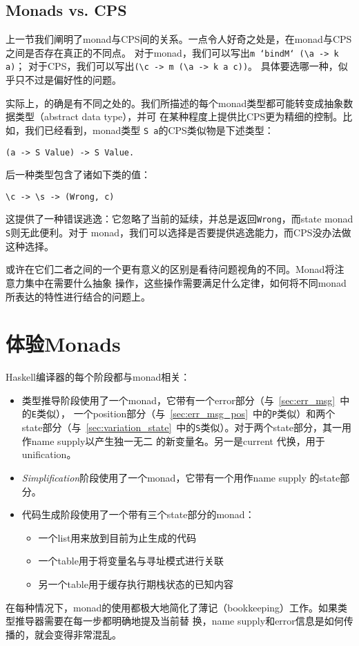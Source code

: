\documentclass[12pt]{article}
\begin{document}
\subsection{Monads vs. CPS}
\indent{}上一节我们阐明了monad与CPS间的关系。一点令人好奇之处是，在monad与CPS之间是否存在真正的不同点。
对于monad，我们可以写出\texttt{m `bindM` (\textbackslash a -> k a)}；
对于CPS，我们可以写出\texttt{(\textbackslash c -> m (\textbackslash a -> k a c))}。
具体要选哪一种，似乎只不过是偏好性的问题。

\indent{}实际上，的确是有不同之处的。我们所描述的每个monad类型都可能转变成抽象数据类型（abstract data type），并可
在某种程度上提供比CPS更为精细的控制。比如，我们已经看到，monad类型 \texttt{S a}的CPS类似物是下述类型：
\begin{verbatim}
(a -> S Value) -> S Value.
\end{verbatim}
\noindent{}后一种类型包含了诸如下类的值：
\begin{verbatim}
\c -> \s -> (Wrong, c)
\end{verbatim}
\noindent{}这提供了一种错误逃逸：它忽略了当前的延续，并总是返回\texttt{Wrong}，而state monad \texttt{S}则无此便利。对于
monad，我们可以选择是否要提供逃逸能力，而CPS没办法做这种选择。

\indent{}或许在它们二者之间的一个更有意义的区别是看待问题视角的不同。Monad将注意力集中在需要什么抽象
操作，这些操作需要满足什么定律，如何将不同monad所表达的特性进行结合的问题上。


\section{体验Monads}
\noindent{}Haskell编译器的每个阶段都与monad相关：
\begin{itemize}
\item 类型推导阶段使用了一个monad，它带有一个error部分（与~\ref{sec:err_msg}~中的\texttt{E}类似），
一个position部分（与~\ref{sec:err_msg_pos}~中的\texttt{P}类似）和两个
state部分（与~\ref{sec:variation_state}~中的\texttt{S}类似）。对于两个state部分，其一用作name supply以产生独一无二
的新变量名。另一是current 代换，用于unification。
\item \textsl{Simplification}阶段使用了一个monad，它带有一个用作name supply 的state部分。
\item 代码生成阶段使用了一个带有三个state部分的monad：
    \begin{itemize}
        \item 一个list用来放到目前为止生成的代码
        \item 一个table用于将变量名与寻址模式进行关联
        \item 另一个table用于缓存执行期栈状态的已知内容
    \end{itemize}
\end{itemize}

\indent{}在每种情况下，monad的使用都极大地简化了薄记（bookkeeping）工作。如果类型推导器需要在每一步都明确地提及当前替
换，name supply和error信息是如何传播的，就会变得非常混乱。
\end{document}
